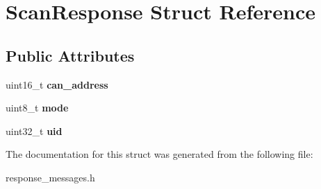 \hypertarget{structScanResponse}{}\section{Scan\+Response Struct Reference}
\label{structScanResponse}
\subsection*{Public Attributes}
\begin{DoxyCompactItemize}
\item 
\mbox{\label{structScanResponse_a5984426066ffa49ea49e9a1093a1f30b}} 
uint16\+\_\+t {\bfseries can\+\_\+address}
\item 
\mbox{\label{structScanResponse_a9189a41b9ad5fc226a4c18f04399ec84}} 
uint8\+\_\+t {\bfseries mode}
\item 
\mbox{\label{structScanResponse_a03bd906c8ce581d26cf4857bf881b9cf}} 
uint32\+\_\+t {\bfseries uid}
\end{DoxyCompactItemize}


The documentation for this struct was generated from the following file\+:\begin{DoxyCompactItemize}
\item 
response\+\_\+messages.\+h\end{DoxyCompactItemize}
